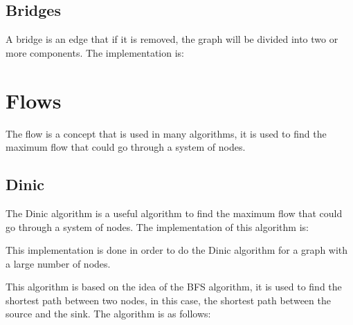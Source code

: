 \subsection{Bridges}

A bridge is an edge that if it is removed, the graph will be divided into two or more components. The implementation is:





\section{Flows}

The flow is a concept that is used in many algorithms, it is used to find the maximum flow that could go through a system of nodes.

\subsection{Dinic}

The Dinic algorithm is a useful algorithm to find the maximum flow that could go through a system of nodes. The implementation of this algorithm is:



This implementation is done in order to do the Dinic algorithm for a graph with a large number of nodes.

This algorithm is based on the idea of the BFS algorithm, it is used to find the shortest path between two nodes, in this case, the shortest path between the source and the sink. The algorithm is as follows:

